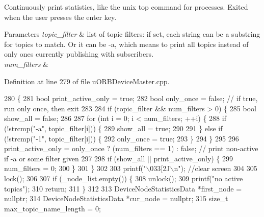 Continuously print statistics, like the unix top command for processes. Exited when the user presses the enter key. 
\begin{DoxyParams}{Parameters}
{\em topic\+\_\+filter} & list of topic filters\+: if set, each string can be a substring for topics to match. Or it can be \textquotesingle{}-\/a\textquotesingle{}, which means to print all topics instead of only ones currently publishing with subscribers. \\
\hline
{\em num\+\_\+filters} & \\
\hline
\end{DoxyParams}


Definition at line 279 of file u\+O\+R\+B\+Device\+Master.\+cpp.


\begin{DoxyCode}
280 \{
281     \textcolor{keywordtype}{bool} print\_active\_only = \textcolor{keyword}{true};
282     \textcolor{keywordtype}{bool} only\_once = \textcolor{keyword}{false}; \textcolor{comment}{// if true, run only once, then exit}
283 
284     \textcolor{keywordflow}{if} (topic\_filter && num\_filters > 0) \{
285         \textcolor{keywordtype}{bool} show\_all = \textcolor{keyword}{false};
286 
287         \textcolor{keywordflow}{for} (\textcolor{keywordtype}{int} i = 0; i < num\_filters; ++i) \{
288             \textcolor{keywordflow}{if} (!strcmp(\textcolor{stringliteral}{"-a"}, topic\_filter[i])) \{
289                 show\_all = \textcolor{keyword}{true};
290 
291             \} \textcolor{keywordflow}{else} \textcolor{keywordflow}{if} (!strcmp(\textcolor{stringliteral}{"-1"}, topic\_filter[i])) \{
292                 only\_once = \textcolor{keyword}{true};
293             \}
294         \}
295 
296         print\_active\_only = only\_once ? (num\_filters == 1) : \textcolor{keyword}{false}; \textcolor{comment}{// print non-active if -a or some
       filter given}
297 
298         \textcolor{keywordflow}{if} (show\_all || print\_active\_only) \{
299             num\_filters = 0;
300         \}
301     \}
302 
303     printf(\textcolor{stringliteral}{"\(\backslash\)033[2J\(\backslash\)n"}); \textcolor{comment}{//clear screen}
304 
305     lock();
306 
307     \textcolor{keywordflow}{if} (\_node\_list.empty()) \{
308         unlock();
309         printf(\textcolor{stringliteral}{"no active topics"});
310         \textcolor{keywordflow}{return};
311     \}
312 
313     DeviceNodeStatisticsData *first\_node = \textcolor{keyword}{nullptr};
314     DeviceNodeStatisticsData *cur\_node = \textcolor{keyword}{nullptr};
315     \textcolor{keywordtype}{size\_t} max\_topic\_name\_length = 0;

\end{DoxyCode}
